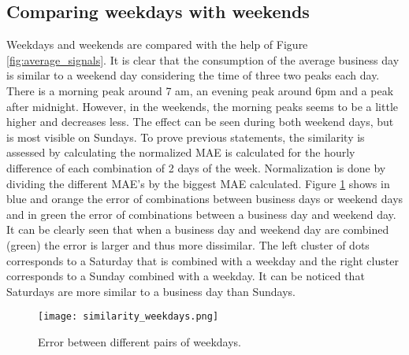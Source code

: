 \subsection{Comparing weekdays with weekends} \label{s:Comparing weekdays with weekends}
Weekdays and weekends are compared with the help of Figure \ref{fig:average_signals}. It is clear that the consumption of the average business day is similar to a weekend day considering the time of three two peaks each day. There is a morning peak around 7 am, an evening peak around 6pm and a peak after midnight. However, in the weekends, the morning peaks seems to be a little higher and decreases less. The effect can be seen during both weekend days, but is most visible on Sundays. To prove previous statements, the similarity is assessed by calculating the normalized MAE is calculated for the hourly difference of each combination of 2 days of the week. Normalization is done by dividing the different MAE's by the biggest MAE calculated. Figure \ref{fig:similarity_weekdays} shows in blue and orange the error of combinations between business days or weekend days and in green the error of combinations between a business day and weekend day. It can be clearly seen that when a business day and weekend day are combined (green) the error is larger and thus more dissimilar. The left cluster of dots corresponds to a Saturday that is combined with a weekday and the right cluster corresponds to a Sunday combined with a weekday. It can be noticed that Saturdays are more similar to a business day than Sundays. 

\begin{figure}[h!]
	\centering
	\texttt{[image: similarity\_weekdays.png]}
	\caption{Error between different pairs of weekdays.}
	\label{fig:similarity_weekdays}
\end{figure}

